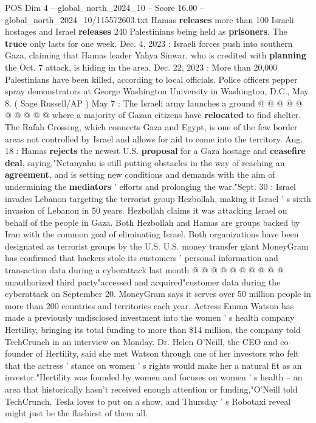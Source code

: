 \begin{textsample}{POS Dim 4 – global\_north\_2024\_10 – Score 16.00 – global\_north\_2024\_10/115572603.txt}
Hamas \textbf{releases} more than 100 Israeli hostages and Israel \textbf{releases} 240 Palestinians being held as \textbf{prisoners}.
The \textbf{truce} only lasts for one week.
Dec. 4, 2023 : Israeli forces push into southern Gaza, claiming that Hamas leader Yahya Sinwar, who is credited with \textbf{planning} the Oct. 7 attack, is hiding in the area.
Dec. 22, 2023 : More than 20,000 Palestinians have been killed, according to local officials.
Police officers pepper spray demonstrators at George Washington University in Washington, D.C., May 8. ( Sage Russell/AP ) May 7 : The Israeli army launches a ground @ @ @ @ @ @ @ @ @ @ where a majority of Gazan citizens have \textbf{relocated} to find shelter.
The Rafah Crossing, which connects Gaza and Egypt, is one of the few border areas not controlled by Israel and allows for aid to come into the territory.
Aug. 18 : Hamas \textbf{rejects} the newest U.S. \textbf{proposal} for a Gaza hostage and \textbf{ceasefire} \textbf{deal}, saying,"Netanyahu is still putting obstacles in the way of reaching an \textbf{agreement}, and is setting new conditions and demands with the aim of undermining the \textbf{mediators} ' efforts and prolonging the war."Sept. 30 : Israel invades Lebanon targeting the terrorist group Hezbollah, making it Israel ' s sixth invasion of Lebanon in 50 years.
Hezbollah claims it was attacking Israel on behalf of the people in Gaza.
Both Hezbollah and Hamas are groups backed by Iran with the common goal of eliminating Israel.
Both organizations have been designated as terrorist groups by the U.S.
U.S. money transfer giant MoneyGram has confirmed that hackers stole its customers ' personal information and transaction data during a cyberattack last month @ @ @ @ @ @ @ @ @ @ unauthorized third party"accessed and acquired"customer data during the cyberattack on September 20.
MoneyGram says it serves over 50 million people in more than 200 countries and territories each year.
Actress Emma Watson has made a previously undisclosed investment into the women ' s health company Hertility, bringing its total funding to more than \$14 million, the company told TechCrunch in an interview on Monday.
Dr.
Helen O'Neill, the CEO and co-founder of Hertility, said she met Watson through one of her investors who felt that the actress ' stance on women ' s rights would make her a natural fit as an investor."Hertility was founded by women and focuses on women ' s health -- an area that historically hasn't received enough attention or funding,"O'Neill told TechCrunch.
Tesla loves to put on a show, and Thursday ' s Robotaxi reveal might just be the flashiest of them all.

\end{textsample}
